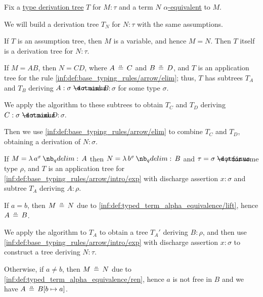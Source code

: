 \begin{algorithm}\label{alg:typed_alpha_conversion}
  Fix a \hyperref[def:type_derivation_tree]{type derivation tree} \( T \) for \( M: \tau \) and a term \( N \) \hyperref[def:typed_term_alpha_equivalence]{\( \alpha \)-equivalent} to \( M \).

  We will build a derivation tree \( T_N \) for \( N: \tau \) with the same assumptions.

  \begin{thmenum}
     If \( T \) is an assumption tree, then \( M \) is a variable, and hence \( M = N \). Then \( T \) itself is a derivation tree for \( N: \tau \).

     If \( M = AB \), then \( N = CD \), where \( A \aequiv C \) and \( B \aequiv D \), and \( T \) is an application tree for the rule \ref{inf:def:base_typing_rules/arrow/elim}; thus, \( T \) has subtrees \( T_A \) and \( T_B \) deriving \( A: \sigma \synimplies \tau \) and \( B: \sigma \) for some type \( \sigma \).

    We apply the algorithm to these subtrees to obtain \( T_C \) and \( T_D \) deriving \( C: \sigma \synimplies \tau \) and \( D: \sigma \).

    Then we use \ref{inf:def:base_typing_rules/arrow/elim} to combine \( T_C \) and \( T_D \), obtaining a derivation of \( N: \sigma \).

     If \( M = \qabs {a^\sigma} A \) then \( N = \qabs {b^\sigma} B \) and \( \tau = \sigma \synimplies \rho \) for some type \( \rho \), and \( T \) is an application tree for \ref{inf:def:base_typing_rules/arrow/intro/exp} with discharge assertion \( x: \sigma \) and subtree \( T_A \) deriving \( A: \rho \).

    \begin{thmenum}
       If \( a = b \), then \( M \aequiv N \) due to \ref{inf:def:typed_term_alpha_equivalence/lift}, hence \( A \aequiv B \).

      We apply the algorithm to \( T_A \) to obtain a tree \( T_A' \) deriving \( B: \rho \), and then use \ref{inf:def:base_typing_rules/arrow/intro/exp} with discharge assertion \( x: \sigma \) to construct a tree deriving \( N: \tau \).

       Otherwise, if \( a \neq b \), then \( M \aequiv N \) due to \ref{inf:def:typed_term_alpha_equivalence/ren}, hence \( a \) is not free in \( B \) and we have \( A \aequiv B[b \mapsto a] \).


\end{thmenum}
\end{thmenum}
\end{algorithm}
